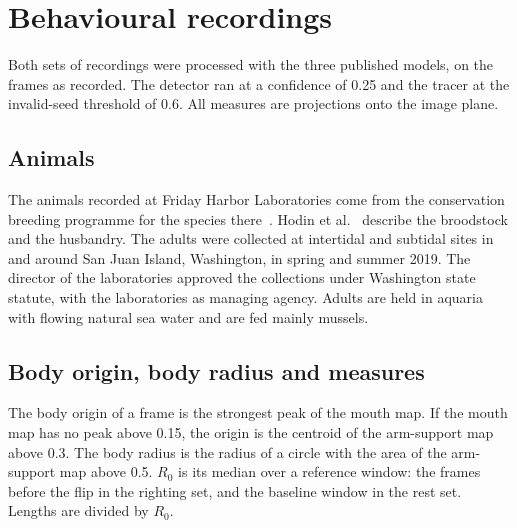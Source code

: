 
\section*{Behavioural recordings}

Both sets of recordings were processed with the three published models, on the frames as recorded.
The detector ran at a confidence of 0.25 and the tracer at the invalid-seed threshold of 0.6.
All measures are projections onto the image plane.

\subsection*{Animals}

The animals recorded at Friday Harbor Laboratories come from the conservation breeding programme for the species there~\cite{hodin2021progress,hodin2025star}.
Hodin et al.~\cite{hodin2025star} describe the broodstock and the husbandry.
The adults were collected at intertidal and subtidal sites in and around San Juan Island, Washington, in spring and summer 2019.
The director of the laboratories approved the collections under Washington state statute, with the laboratories as managing agency.
Adults are held in aquaria with flowing natural sea water and are fed mainly mussels.

\subsection*{Body origin, body radius and measures}

The body origin of a frame is the strongest peak of the mouth map.
If the mouth map has no peak above 0.15, the origin is the centroid of the arm-support map above 0.3.
The body radius is the radius of a circle with the area of the arm-support map above 0.5.
$R_0$ is its median over a reference window: the frames before the flip in the righting set, and the baseline window in the rest set.
Lengths are divided by $R_0$.

